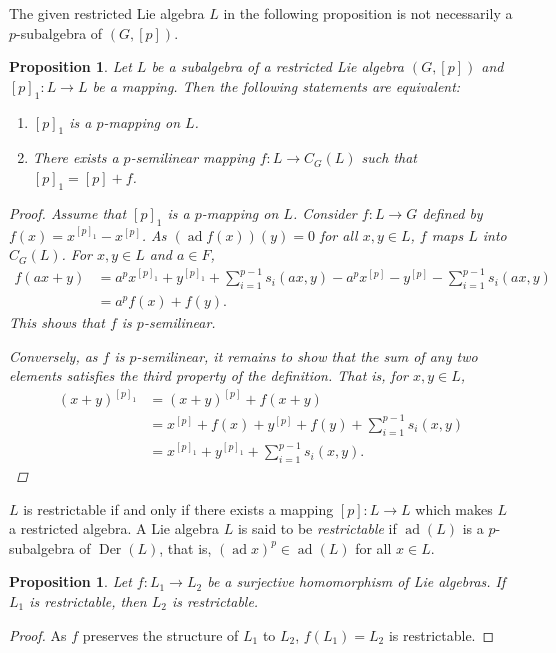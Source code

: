\documentclass[12pt,MSc]{muthesis_2023}
\theoremstyle{plain}%
\newtheorem{Proposition}[FactCounter]{Proposition} %
\theoremstyle{definition}
\theoremstyle{remark}
\DeclareMathOperator{\ad}{ad}
\DeclareMathOperator{\Der}{Der}
\begin{document}
The given restricted Lie algebra $L$ in the following proposition \cite[Chapter 1]{SF} is not necessarily a $p$-subalgebra of $(G, [p])$.
\begin{Proposition}\label{p1pmappingpsemilinear}
Let $L$ be a subalgebra of a restricted Lie algebra $(G, [p])$ and $[p]_1: L \rightarrow L$ be a mapping. Then the following statements are equivalent:
\begin{enumerate}
\item[(1)]
$[p]_1$ is a $p$-mapping on $L$.
\item[(2)]
There exists a $p$-semilinear mapping $f: L\rightarrow C_G(L)$ such that $[p]_1=[p]+f$.
\end{enumerate}
\begin{proof}
Assume that $[p]_1$ is a $p$-mapping on $L$. Consider $f: L\rightarrow G$ defined by $f(x)=x^{[p]_1}-x^{[p]}$. As $(\ad f(x))(y)=0$ for all $x,y\in L$, $f$ maps $L$ into $C_G(L)$. For $x,y\in L$ and $a\in F$,
\begin{align*}
f(ax+y)&=a^px^{[p]_1}+y^{[p]_1}+\sum_{i=1}^{p-1}s_i(ax,y)-a^px^{[p]}-y^{[p]}-\sum_{i=1}^{p-1}s_i(ax,y)\\
&=a^pf(x)+f(y).
\end{align*}
This shows that $f$ is $p$-semilinear.

Conversely, as $f$ is $p$-semilinear, it remains to show that the sum of any two elements satisfies the third property of the definition. That is, for $x,y\in L$,
\begin{align*}
(x+y)^{[p]_1}&=(x+y)^{[p]}+f(x+y)\\
 & =x^{[p]}+f(x)+y^{[p]}+f(y)+\sum_{i=1}^{p-1}s_i(x,y)\\
 & = x^{[p]_1}+y^{[p]_1}+\sum_{i=1}^{p-1}s_i(x,y).
\end{align*}
\end{proof}
\end{Proposition}

$L$ is restrictable if and only if there exists a mapping $[p]:L\rightarrow L$ which makes $L$ a restricted algebra. A Lie algebra $L$ is said to be \textit{restrictable} if $\ad (L)$ is a $p$-subalgebra of $\Der(L)$, that is, $(\ad x)^p\in \ad(L)$ for all $x\in L$.


\begin{Proposition}\label{L1restL2rest}
Let $f: L_1 \rightarrow L_2$ be a surjective homomorphism of Lie algebras. If $L_1$ is restrictable, then $L_2$ is restrictable.
\end{Proposition}
\begin{proof}
As $f$ preserves the structure of $L_1$ to $L_2$, $f(L_1)=L_2$ is restrictable.
\end{proof}
\end{document}
